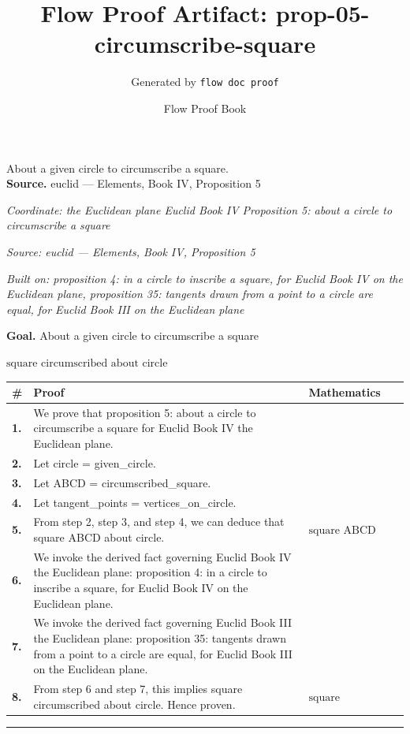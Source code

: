 \documentclass[11pt]{article}
\title{Flow Proof Artifact: prop-05-circumscribe-square}
\author{Generated by \texttt{flow doc proof}}
\date{Flow Proof Book}
\theoremstyle{definition}
\begin{document}
\maketitle
About a given circle to circumscribe a square.\\[0.5em]
\textbf{Source.} euclid — Elements, Book IV, Proposition 5\\[0.5em]
\bigskip
{}\par
\smallskip\noindent\textit{Coordinate: the Euclidean plane \cdot Euclid Book IV \cdot Proposition 5: about a circle to circumscribe a square}\par
\smallskip\noindent\textit{Source: euclid — Elements, Book IV, Proposition 5}\par
\smallskip\noindent\textit{Built on: proposition 4: in a circle to inscribe a square, for Euclid Book IV on the Euclidean plane, proposition 35: tangents drawn from a point to a circle are equal, for Euclid Book III on the Euclidean plane}\par
\medskip
\noindent\textbf{Goal.} About a given circle to circumscribe a square\par
\noindent$\displaystyle \text{square circumscribed about circle}$\par
\medskip
\noindent
\begin{tabular}{@{} >{\raggedright\arraybackslash}p{} >{\raggedright\arraybackslash}p{} >{\raggedleft\arraybackslash}p{} @{}}
\textbf{\#} & \textbf{Proof} & \textbf{Mathematics} \\
\midrule
\textbf{1.} & We prove that proposition 5: about a circle to circumscribe a square for Euclid Book IV the Euclidean plane. & \\[0.45em]
\textbf{2.} & Let circle = given\_circle. & \\[0.45em]
\textbf{3.} & Let ABCD = circumscribed\_square. & \\[0.45em]
\textbf{4.} & Let tangent\_points = vertices\_on\_circle. & \\[0.45em]
\textbf{5.} & From step 2, step 3, and step 4, we can deduce that square ABCD about circle. & $\displaystyle \text{square ABCD about circle}$ \\[0.45em]
\textbf{6.} & We invoke the derived fact governing Euclid Book IV the Euclidean plane: proposition 4: in a circle to inscribe a square, for Euclid Book IV on the Euclidean plane. & \\[0.45em]
\textbf{7.} & We invoke the derived fact governing Euclid Book III the Euclidean plane: proposition 35: tangents drawn from a point to a circle are equal, for Euclid Book III on the Euclidean plane. & \\[0.45em]
\textbf{8.} & From step 6 and step 7, this implies square circumscribed about circle. Hence proven. & $\displaystyle \text{square circumscribed about circle}$ \\[0.45em]
\bottomrule
\end{tabular}
\label{thm:Geometry-Euclid Book IV-proposition_5_about_a_circle_to_circumscribe_a_square}
\par\medskip\hrule
\end{document}

